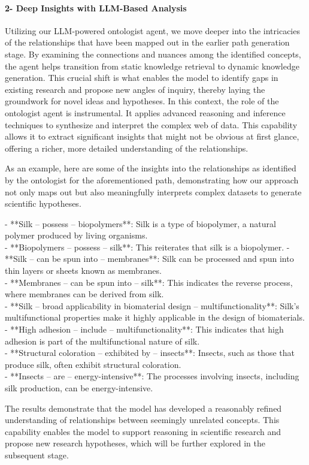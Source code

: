 \documentclass{article}
\begin{document}
\paragraph{2- Deep Insights with LLM-Based Analysis} Utilizing our LLM-powered ontologist agent, we move deeper into the intricacies of the relationships that have been mapped out in the earlier path generation stage. By examining the connections and nuances among the identified concepts, the agent helps transition from static knowledge retrieval to dynamic knowledge generation. This crucial shift is what enables the model to identify gaps in existing research and propose new angles of inquiry, thereby laying the groundwork for novel ideas and hypotheses. In this context, the role of the ontologist agent is instrumental. It applies advanced reasoning and inference techniques to synthesize and interpret the complex web of data. This capability allows it to extract significant insights that might not be obvious at first glance, offering a richer, more detailed understanding of the relationships.

As an example, here are some of the insights into the relationships as identified by the ontologist for the aforementioned path, demonstrating how our approach not only maps out but also meaningfully interprets complex datasets to generate scientific hypotheses.

\begin{Box1}[colbacktitle={black!20!white}, colback={white!10!white}, breakable]{}
\footnotesize{- **Silk -- possess -- biopolymers**: Silk is a type of biopolymer, a natural polymer produced by living organisms.\\
- **Biopolymers -- possess -- silk**: This reiterates that silk is a biopolymer.
- **Silk -- can be spun into -- membranes**: Silk can be processed and spun into thin layers or sheets known as membranes.\\
- **Membranes -- can be spun into -- silk**: This indicates the reverse process, where membranes can be derived from silk.\\
- **Silk -- broad applicability in biomaterial design -- multifunctionality**: Silk's multifunctional properties make it highly applicable in the design of biomaterials.\\
- **High adhesion -- include -- multifunctionality**: This indicates that high adhesion is part of the multifunctional nature of silk.\\
- **Structural coloration -- exhibited by -- insects**: Insects, such as those that produce silk, often exhibit structural coloration.\\
- **Insects -- are -- energy-intensive**: The processes involving insects, including silk production, can be energy-intensive.}
\end{Box1}
The results demonstrate that the model has developed a reasonably refined understanding of relationships between seemingly unrelated concepts. This capability enables the model to support reasoning in scientific research and propose new research hypotheses, which will be further explored in the subsequent stage.
\end{document}
